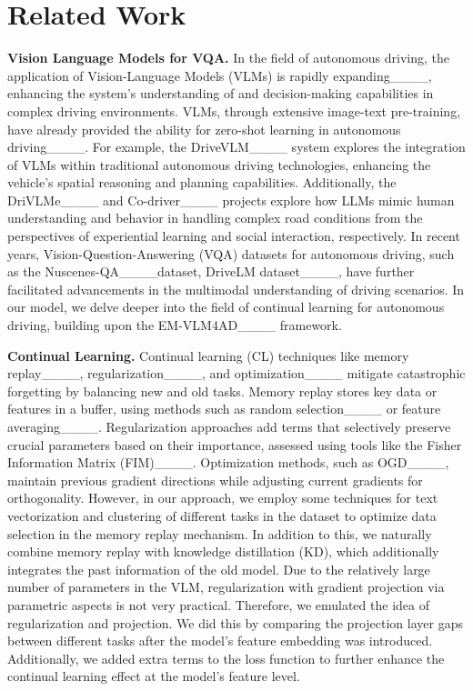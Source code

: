 \section{Related Work}
\noindent\textbf{Vision Language Models for VQA.} In the field of autonomous driving, the application of Vision-Language Models (VLMs) is rapidly expanding____, enhancing the system's understanding of and decision-making capabilities in complex driving environments. VLMs, through extensive image-text pre-training, have already provided the ability for zero-shot learning in autonomous driving____. For example, the DriveVLM____ system explores the integration of VLMs within traditional autonomous driving technologies, enhancing the vehicle's spatial reasoning and planning capabilities. Additionally, the DriVLMe____ and Co-driver____ projects explore how LLMs mimic human understanding and behavior in handling complex road conditions from the perspectives of experiential learning and social interaction, respectively. In recent years, Vision-Question-Answering (VQA) datasets for autonomous driving, such as the Nuscenes-QA____dataset, DriveLM dataset____, have further facilitated advancements in the multimodal understanding of driving scenarios. In our model, we delve deeper into the field of continual learning for autonomous driving, building upon the EM-VLM4AD____ framework.  

\noindent\textbf{Continual Learning.} Continual learning (CL) techniques like memory replay____, regularization____, and optimization____ mitigate catastrophic forgetting by balancing new and old tasks. Memory replay stores key data or features in a buffer, using methods such as random selection____ or feature averaging____. Regularization approaches add terms that selectively preserve crucial parameters based on their importance, assessed using tools like the Fisher Information Matrix (FIM)____. Optimization methods, such as OGD____, maintain previous gradient directions while adjusting current gradients for orthogonality. However, in our approach, we employ some techniques for text vectorization and clustering of different tasks in the dataset to optimize data selection in the memory replay mechanism. In addition to this, we naturally combine memory replay with knowledge distillation (KD), which additionally integrates the past information of the old model. Due to the relatively large number of parameters in the VLM, regularization with gradient projection via parametric aspects is not very practical. Therefore, we emulated the idea of regularization and projection. We did this by comparing the projection layer gaps between different tasks after the model's feature embedding was introduced. Additionally, we added extra terms to the loss function to further enhance the continual learning effect at the model's feature level.
